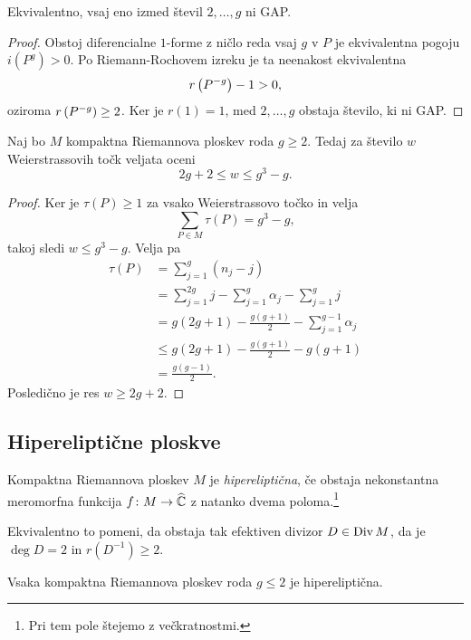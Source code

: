 \begin{trditev}
Ekvivalentno, vsaj eno izmed števil $2, \dots, g$ ni GAP.
\end{trditev}

\begin{proof}
Obstoj diferencialne $1$-forme z ničlo reda vsaj $g$ v $P$ je
ekvivalentna pogoju $i(P^g) > 0$. Po Riemann-Rochovem izreku je ta
neenakost ekvivalentna
\[
r \left(P^{-g}\right) - 1 > 0,
\]
oziroma $r \left(P^{-g}\right) \geq 2$. Ker je $r(1) = 1$, med
$2, \dots, g$ obstaja število, ki ni GAP.
\end{proof}

\begin{trditev}
Naj bo $M$ kompaktna Riemannova ploskev roda $g \geq 2$. Tedaj za
število $w$ Weierstrassovih točk veljata oceni
\[
2g + 2 \leq w \leq g^3 - g.
\]
\end{trditev}

\begin{proof}
Ker je $\tau(P) \geq 1$ za vsako Weierstrassovo točko in velja
\[
\sum_{P \in M} \tau(P) = g^3 - g,
\]
takoj sledi $w \leq g^3 - g$. Velja pa
\begin{align*}
\tau(P) &= \sum_{j=1}^g (n_j - j)
\\
&=
\sum_{j=1}^{2g} j - \sum_{j=1}^g \alpha_j - \sum_{j=1}^g j
\\
&=
g(2g+1) - \frac{g(g+1)}{2} - \sum_{j=1}^{g-1} \alpha_j
\\
&\leq
g(2g+1) - \frac{g(g+1)}{2} - g(g+1)
\\
&=
\frac{g(g-1)}{2}.
\end{align*}
Posledično je res $w \geq 2g + 2$.
\end{proof}

\subsection{Hipereliptične ploskve}

\begin{definicija}
Kompaktna Riemannova ploskev $M$ je \emph{hipereliptična}, če
obstaja nekonstantna meromorfna funkcija $f \colon M \to \widehat{\mathbb{C}}$ z
natanko dvema poloma.\footnote{Pri tem pole štejemo z
večkratnostmi.}
\end{definicija}

Ekvivalentno to pomeni, da obstaja tak efektiven divizor
$D \in \operatorname{Div} M$, da je $\deg D = 2$ in $r(D^{-1}) \geq 2$.

\begin{trditev}
Vsaka kompaktna Riemannova ploskev roda $g \leq 2$ je
hipereliptična.
\end{trditev}

